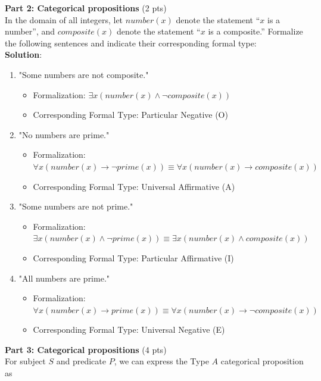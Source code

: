 \documentclass[12pt]{article}
\begin{document}
	\pagebreak
	
	\noindent \textbf{Part 2: Categorical propositions} (2 pts)\\
	In the domain of all integers, let $number(x)$ denote the statement “$x$ is a number”, and $composite(x)$ denote the statement “$x$ is a composite.” Formalize the following sentences and indicate their corresponding formal type:\\
							
	\textbf{Solution}:
	\begin{enumerate}
		\item "Some numbers are not composite."
		      \begin{itemize}
		      	\item Formalization: $\exists x(number(x) \land \lnot composite(x))$
		      	\item Corresponding Formal Type: Particular Negative (O)
		      \end{itemize}
		\item "No numbers are prime."
		      \begin{itemize}
				\item Formalization: $\forall x(number(x) \rightarrow \lnot prime(x)) \equiv \forall x(number(x) \rightarrow composite(x) )$
				\item Corresponding Formal Type: Universal Affirmative (A)
		      \end{itemize}
		\item "Some numbers are not prime."
		      \begin{itemize}
				\item Formalization: $\exists x(number(x) \land \lnot prime(x)) \equiv \exists x(number(x) \land composite(x))$
				\item Corresponding Formal Type: Particular Affirmative (I)
		      \end{itemize}
		\item "All numbers are prime."
		      \begin{itemize}
				\item Formalization: $\forall x(number(x) \rightarrow prime(x)) \equiv \forall x(number(x)\rightarrow \lnot composite(x))$
				\item Corresponding Formal Type: Universal Negative (E)
		      \end{itemize}
	\end{enumerate}
	
	\pagebreak

	\noindent \textbf{Part 3: Categorical propositions} (4 pts)\\
	For subject $S$ and predicate $P$, we can express the Type $A$ categorical proposition as
							
\end{document}
